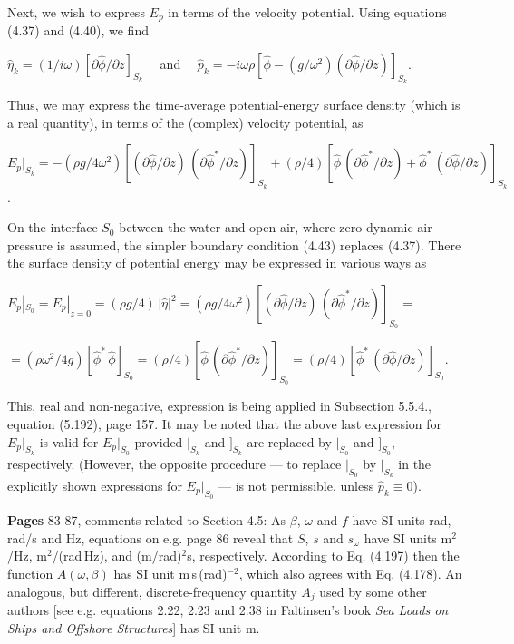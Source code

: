 \documentclass[a4paper,12pt]{article}
\begin{document}
Next, we wish to express $E_p$ in terms of the velocity potential. Using equations (4.37) and (4.40), we find \\ \centerline{$\hat{\eta}_k = (1/i\omega) [\partial{\hat{\phi}}/\partial {z}]_{S_k}$ \,\,\,\, and \,\,\,\, $\hat{p}_k = - i\omega \rho [\hat{\phi} - (g/\omega^2) (\partial{\hat{\phi}}/\partial {z})]_{S_k}$.} Thus, we may express the time-average potential-energy surface density (which is a real quantity), in terms of the (complex) velocity potential, as  
\\ \vspace{0.2cm}
\centerline{$E_p|_{S_k}  = - (\rho g/4 \omega^2)[(\partial{\hat{\phi}}/\partial {z})\, (\partial{\hat{\phi}^*}/\partial {z})]_{S_k} 
+ (\rho/4)[{\hat{\phi}}\, (\partial{\hat{\phi}^*}/\partial {z}) + 
{\hat{\phi}}^*\, (\partial{\hat{\phi}}/\partial {z})]_{S_k}$.}

On the interface $S_0$ between the water and open air, where zero dynamic air pressure is assumed, the simpler  boundary condition (4.43) replaces (4.37). There the surface density of potential energy may be expressed in various ways as \\
\centerline{$E_p|_{S_0}  = E_p|_{z=0}  = (\rho g /4)\, |\hat{\eta}|^2 = (\rho g/4 \omega^2)[(\partial{\hat{\phi}}/\partial {z})\, (\partial{\hat{\phi}^*}/\partial {z})]_{S_0} %
=
$}
\centerline{$ = (\rho \omega^2 /4g)[{\hat{\phi}^*}\, {\hat{\phi}}]_{S_0}  
 = (\rho /4)[{\hat{\phi}}\, (\partial{\hat{\phi}^*}/\partial {z})]_{S_0} = (\rho /4)[{\hat{\phi}^*}\, (\partial{\hat{\phi}}/\partial {z})]_{S_0}
$.}
This, real and non-negative, expression is being applied in Subsection 5.5.4., equation (5.192), page 157. It may be noted that the above last expression for $E_p|_{S_k}$ is valid for $E_p|_{S_0}$ provided $|_{S_k}$ and $]_{S_k}$ are replaced by $|_{S_0}$ and $]_{S_0}$, respectively. (However, the opposite procedure --- to replace $|_{S_0}$ by $|_{S_k}$ in the explicitly shown expressions for $E_p|_{S_0}$ --- is not permissible, unless $\hat{p}_k \equiv 0$).\ 
\vspace{0.2cm}
\vspace{0.2cm}

\noindent %
{\bf Pages} 83-87,  comments related to Section 4.5: As $\beta$, $\omega$ and $f$ have SI units rad, rad/s and Hz,  equations on e.g. page 86 reveal that $S$, $s$ and $s_{\omega}$ have SI units m$^2$/Hz, m$^2$/(rad\,Hz), and (m/rad)$^2$s, respectively. According to Eq. (4.197) then the function $A(\omega,\beta)$ has SI unit m\,s\,(rad)$^{-2}$, which also agrees with Eq. (4.178). An analogous, but different, discrete-frequency quantity $A_j$ used by some other authors [see e.g. equations 2.22, 2.23 and 2.38 in Faltinsen's book {\it Sea Loads on Ships and Offshore Structures}] has SI unit m. %
\vspace{0.2cm}
\end{document}
